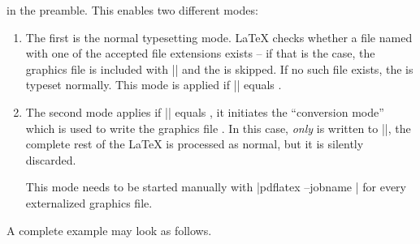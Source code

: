 {\declareandlabel{\pgfrealjobname}

\noindent in the preamble. This enables two different modes:
%
\begin{enumerate}
    \item The first is the normal typesetting mode. \LaTeX{} checks whether a
        file named  with one of the accepted file
        extensions exists -- if that is the case, the graphics file is
        included with |\pgfimage| and the  is skipped.
        If no such file exists, the  is typeset
        normally. This mode is applied if |\jobname| equals .
    \item The second mode applies if |\jobname| equals , it initiates the ``conversion mode'' which is used to write
        the graphics file . In this case, \emph{only}
         is written to |\jobname|, the complete rest
        of the \LaTeX{} is processed as normal, but it is silently discarded.

        This mode needs to be started manually with
        |pdflatex --jobname | for every externalized
        graphics file.
\end{enumerate}
%
A complete example may look as follows.
%
}
